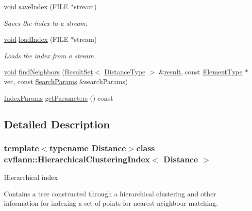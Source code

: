\begin{DoxyCompactItemize}
\item 
\hyperlink{legacy_8hpp_a8bb47f092d473522721002c86c13b94e}{void} \hyperlink{classcvflann_1_1HierarchicalClusteringIndex_a8159af14901976754a61fd6a41ef3345}{save\-Index} (F\-I\-L\-E $\ast$stream)
\begin{DoxyCompactList}\small\item\em Saves the index to a stream. \end{DoxyCompactList}\item 
\hyperlink{legacy_8hpp_a8bb47f092d473522721002c86c13b94e}{void} \hyperlink{classcvflann_1_1HierarchicalClusteringIndex_a549a094e4701380f027e288095c0741e}{load\-Index} (F\-I\-L\-E $\ast$stream)
\begin{DoxyCompactList}\small\item\em Loads the index from a stream. \end{DoxyCompactList}\item 
\hyperlink{legacy_8hpp_a8bb47f092d473522721002c86c13b94e}{void} \hyperlink{classcvflann_1_1HierarchicalClusteringIndex_af25708c9cdeed93aeef8a533756832a8}{find\-Neighbors} (\hyperlink{classcvflann_1_1ResultSet}{Result\-Set}$<$ \hyperlink{classcvflann_1_1HierarchicalClusteringIndex_af8e155c4fe99eaf41a492fddfcb87fcf}{Distance\-Type} $>$ \&\hyperlink{legacy_8hpp_a0bb77d54f6769867cfdf389897bd8e43}{result}, const \hyperlink{classcvflann_1_1HierarchicalClusteringIndex_a8b00f29310310cb2b1ebf3bfc61ec2ed}{Element\-Type} $\ast$vec, const \hyperlink{structcvflann_1_1SearchParams}{Search\-Params} \&search\-Params)
\item 
\hyperlink{namespacecvflann_a742b4c7076c21012054af74a9ee48289}{Index\-Params} \hyperlink{classcvflann_1_1HierarchicalClusteringIndex_a66c74a8e10afd5f45e3c34232d2c0fd4}{get\-Parameters} () const 
\end{DoxyCompactItemize}


\subsection{Detailed Description}
\subsubsection*{template$<$typename Distance$>$class cvflann\-::\-Hierarchical\-Clustering\-Index$<$ Distance $>$}

Hierarchical index

Contains a tree constructed through a hierarchical clustering and other information for indexing a set of points for nearest-\/neighbour matching. 

